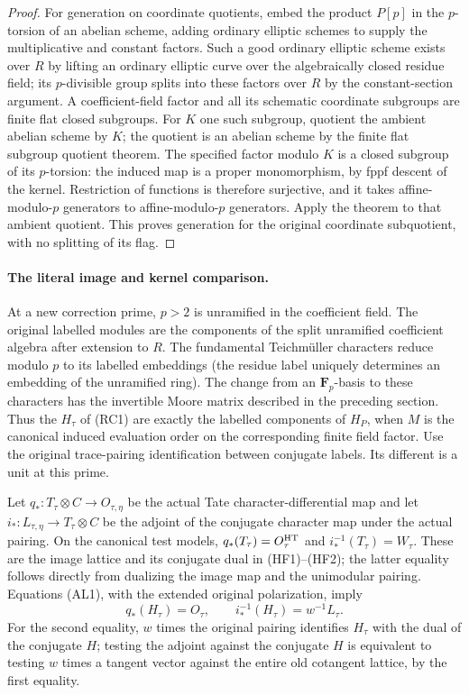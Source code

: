 \begin{proof}
For generation on coordinate quotients, embed the product
\(P[p]\) in the \(p\)-torsion of an abelian scheme, adding
ordinary elliptic schemes to supply the multiplicative and
constant factors. Such a good ordinary elliptic scheme exists
over \(R\) by lifting an ordinary elliptic curve over the
algebraically closed residue field; its \(p\)-divisible group
splits into these factors over \(R\) by the constant-section
argument. A coefficient-field factor and all its schematic
coordinate subgroups are finite flat closed subgroups.
For \(K\) one such subgroup, quotient the ambient abelian
scheme by \(K\); the quotient is an abelian scheme by the
finite flat subgroup quotient theorem. The specified factor
modulo \(K\) is a closed subgroup of its \(p\)-torsion:
the induced map is a proper monomorphism, by fppf descent
of the kernel. Restriction of functions is therefore
surjective, and it takes affine-modulo-\(p\) generators to
affine-modulo-\(p\) generators. Apply the theorem to that
ambient quotient. This proves generation for the original
coordinate subquotient, with no splitting of its flag.
\end{proof}

\paragraph{The literal image and kernel comparison.}
At a new correction prime, \(p>2\) is unramified in the
coefficient field. The original labelled modules are the
components of the split unramified coefficient algebra after
extension to \(R\). The fundamental Teichm\"uller characters
reduce modulo \(p\) to its labelled embeddings (the residue
label uniquely determines an embedding of the unramified
ring). The change from an \(\mathbf F_p\)-basis to these
characters has the invertible Moore matrix described in the
preceding section. Thus the \(H_\tau\) of (RC1) are exactly
the labelled components of \(H_P\), when \(M\) is the
canonical induced evaluation order on the corresponding
finite field factor. Use the original trace-pairing
identification between conjugate labels. Its different
is a unit at this prime.

Let \(q_*:T_\tau\otimes C\to O_{\tau,\eta}\) be the actual
Tate character-differential map and let \(i_*:L_{\tau,\eta}
\to T_\tau\otimes C\) be the adjoint of the conjugate
character map under the actual pairing. On the canonical
test models, \(q_*(T_\tau)=O_\tau^{\rm HT}\) and
\(i_*^{-1}(T_\tau)=W_\tau\). These are the image lattice
and its conjugate dual in (HF1)--(HF2); the latter equality
follows directly from dualizing the image map and the
unimodular pairing. Equations (AL1), with the extended
original polarization, imply
\[
 q_*(H_\tau)=O_\tau,\qquad
 i_*^{-1}(H_\tau)=w^{-1}L_\tau.                         \tag{AL3}
\]
For the second equality, \(w\) times the original pairing
identifies \(H_\tau\) with the dual of the conjugate \(H\);
testing the adjoint against the conjugate \(H\) is
equivalent to testing \(w\) times a tangent vector against
the entire old cotangent lattice, by the first equality.


